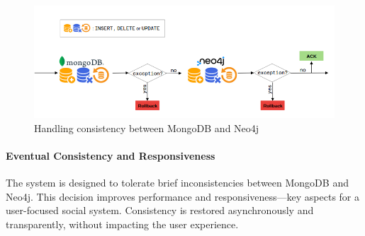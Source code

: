 \begin{figure}[!ht]
    \centering
    \includegraphics[scale=0.5]{./resources/rollback.png}
    \caption{Handling consistency between MongoDB and Neo4j}
    \label{fig:mongo-neo4j-sync}
\end{figure}

\paragraph{Eventual Consistency and Responsiveness}

The system is designed to tolerate brief inconsistencies between MongoDB and Neo4j. This decision improves performance and responsiveness—key aspects for a user-focused social system. Consistency is restored asynchronously and transparently, without impacting the user experience.
